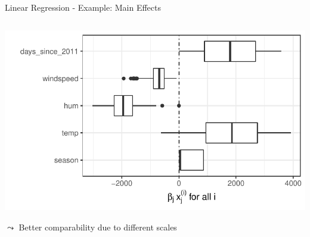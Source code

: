 \documentclass[11pt,compress,t,notes=noshow, aspectratio=169, xcolor=table]{beamer}
\begin{document}
\begin{frame}{Linear Regression - Example: Main Effects}
\begin{columns}[T]
\begin{column}{0.47\textwidth}
  \includegraphics[width = \textwidth]{figure/plot_lin_effect.pdf}
  \begin{center}
    $\leadsto$ Better comparability due to different scales
  \end{center}
   
\end{column}
\end{columns}
\end{frame}
\end{document}
